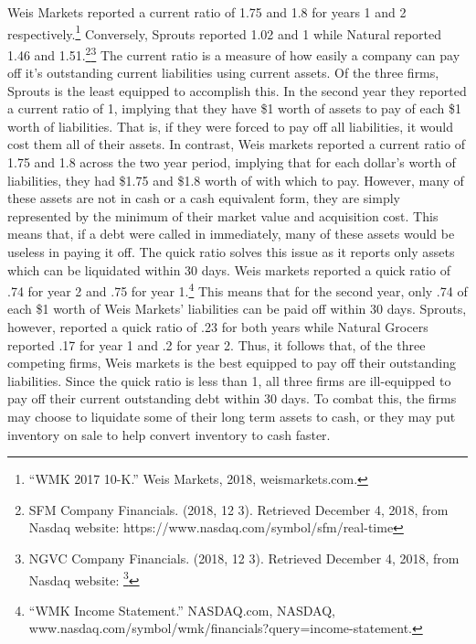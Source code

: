 \documentclass[12pt]{article}
\begin{document}
\begin{doublespacing}
Weis Markets reported a current ratio of 1.75 and 1.8 for years 1 and 2 respectively.\footnote{“WMK 2017 10-K.” Weis Markets, 2018, weismarkets.com.} Conversely, Sprouts reported 1.02 and 1 while Natural reported 1.46 and 1.51.\footnote{SFM Company Financials. (2018, 12 3). Retrieved December 4, 2018, from Nasdaq website: 
     https://www.nasdaq.com/symbol/sfm/real-time }\footnote{NGVC Company Financials. (2018, 12 3). Retrieved December 4, 2018, from Nasdaq website: 
     \footnote{SFM Company Financials. (2018, 12 3). Retrieved December 4, 2018, from Nasdaq 
     website: https://www.nasdaq.com/symbol/sfm/real-time } } The current ratio is a measure of how easily a company can pay off it’s outstanding current liabilities using current assets. Of the three firms, Sprouts is the least equipped to accomplish this. In the second year they reported a current ratio of 1, implying that they have \$1 worth of assets to pay of each \$1 worth of liabilities. That is, if they were forced to pay off all liabilities, it would cost them all of their assets. In contrast, Weis markets reported a current ratio of 1.75 and 1.8 across the two year period, implying that for each dollar’s worth of liabilities, they had \$1.75 and \$1.8 worth of with which to pay. However, many of these assets are not in cash or a cash equivalent form, they are simply represented by the minimum of their market value and acquisition cost. This means that, if a debt were called in immediately, many of these assets would be useless in paying it off. The quick ratio solves this issue as it reports only assets which can be liquidated within 30 days. Weis markets reported a quick ratio of .74 for year 2 and .75 for year 1.\footnote{“WMK Income Statement.” NASDAQ.com, NASDAQ, www.nasdaq.com/symbol/wmk/financials?query=income-statement.} This means that for the second year, only .74 of each \$1 worth of Weis Markets’ liabilities can be paid off within 30 days. Sprouts, however, reported a quick ratio of .23 for both years while Natural Grocers reported .17 for year 1 and .2 for year 2. Thus, it follows that, of the three competing firms, Weis markets is the best equipped to pay off their outstanding liabilities. Since the quick ratio is less than 1, all three firms are ill-equipped to pay off their current outstanding debt within 30 days. To combat this, the firms may choose to liquidate some of their long term assets to cash, or they may put inventory on sale to help convert inventory to cash faster. 


\end{doublespacing}
\end{document}

